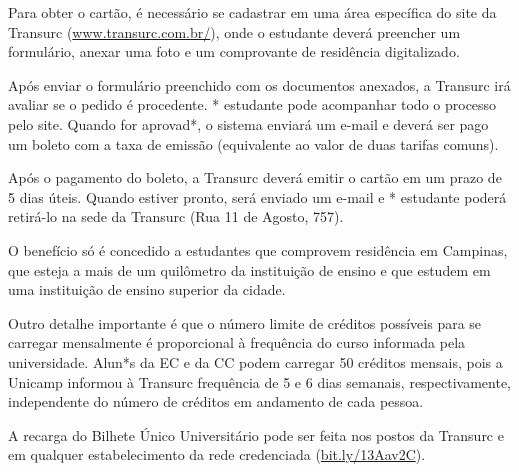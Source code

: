 Para obter o cartão, é necessário se cadastrar em uma área específica do site
da Transurc (\url{www.transurc.com.br/}), onde o estudante deverá preencher
um formulário, anexar uma foto e um comprovante de residência digitalizado.

Após enviar o formulário preenchido com os documentos anexados, a Transurc
irá avaliar se o pedido é procedente. * estudante pode acompanhar todo o
processo pelo site. Quando for aprovad*, o sistema enviará um e-mail e deverá
ser pago um boleto com a taxa de emissão (equivalente ao valor de duas
tarifas comuns).

Após o pagamento do boleto, a Transurc deverá emitir o cartão em um prazo de
5 dias úteis. Quando estiver pronto, será enviado um e-mail e * estudante
poderá retirá-lo na sede da Transurc (Rua 11 de Agosto, 757).

O benefício só é concedido a estudantes que comprovem residência em Campinas,
que esteja a mais de um quilômetro da instituição de ensino e que estudem em
uma instituição de ensino superior da cidade.

Outro detalhe importante é que o número limite de créditos possíveis para se
carregar mensalmente é proporcional à frequência do curso informada pela
universidade. Alun*s da EC e da CC podem carregar 50 créditos mensais, pois
a Unicamp informou à Transurc frequência de 5 e 6 dias semanais,
respectivamente, independente do número de créditos em andamento de cada
pessoa.

A recarga do Bilhete Único Universitário pode ser feita nos postos da
Transurc e em qualquer estabelecimento da rede credenciada
(\url{bit.ly/13Aav2C}).

